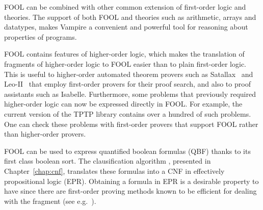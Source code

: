 FOOL can be combined with other common extension of first-order logic and theories. The support of both FOOL and theories such as arithmetic, arrays and datatypes, makes Vampire a convenient and powerful tool for reasoning about properties of programs.

FOOL contains features of higher-order logic, which makes the translation of fragments of higher-order logic to FOOL easier than to plain first-order logic. This is useful to higher-order automated theorem provers such as Satallax~\cite{Satallax} and Leo-II~\cite{LeoII} that employ first-order provers for their proof search, and also to proof assistants such as Isabelle. Furthermore, some problems that previously required higher-order logic can now be expressed directly in FOOL. For example, the current version of the TPTP library contains over a hundred of such problems. One can check these problems with first-order provers that support FOOL rather than higher-order provers.

FOOL can be used to express quantified boolean formulas (QBF) thanks to its first class boolean sort. The clausification algorithm \nfcnf{}, presented in Chapter~\ref{chap:cnf}, translates these formulas into a CNF in effectively propositional logic (EPR). Obtaining a formula in EPR is a desirable property to have since there are first-order proving methods known to be efficient for dealing with the fragment (see e.g.~\cite{DBLP:conf/birthday/Korovin13}).

